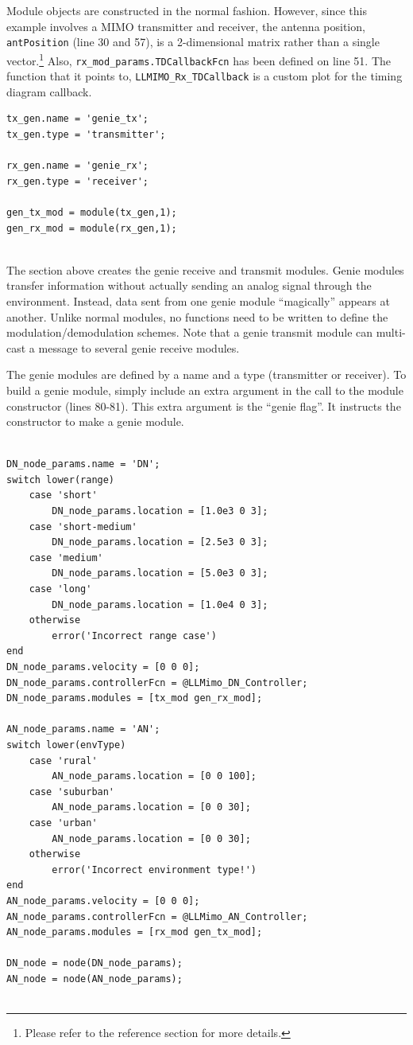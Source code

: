 Module objects are constructed in the normal fashion.  However,
since this example involves a MIMO transmitter and receiver, the
antenna position, \verb+antPosition+ (line 30 and 57), is a
2-dimensional matrix rather than a single vector.\footnote{Please
refer to the reference section for more details.}  Also,
\verb+rx_mod_params.TDCallbackFcn+ has been defined on line 51.  The
function that it points to, \verb+LLMIMO_Rx_TDCallback+ is a custom
plot for the timing diagram callback.

\begin{lstlisting}[name=llmimoBuild]
% Create genie modules
tx_gen.name = 'genie_tx';
tx_gen.type = 'transmitter';

rx_gen.name = 'genie_rx';
rx_gen.type = 'receiver';

gen_tx_mod = module(tx_gen,1);
gen_rx_mod = module(rx_gen,1);


\end{lstlisting}

The section above creates the genie receive and transmit modules.
Genie modules transfer information without actually sending an
analog signal through the environment.  Instead, data sent from one
genie module ``magically'' appears at another.  Unlike normal
modules, no functions need to be written to define the
modulation/demodulation schemes.  Note that a genie transmit module can multi-cast a message to several genie receive modules.

The genie modules are defined by a name and a type (transmitter or
receiver). To build a genie module, simply include an extra argument
in the call to the module constructor (lines 80-81).  This extra
argument is the ``genie flag''.  It instructs the constructor to
make a genie module.

\begin{lstlisting}[name=llmimoBuild]
% Define nodes

DN_node_params.name = 'DN';
switch lower(range)
    case 'short'
        DN_node_params.location = [1.0e3 0 3];
    case 'short-medium'
        DN_node_params.location = [2.5e3 0 3];
    case 'medium'
        DN_node_params.location = [5.0e3 0 3];
    case 'long'
        DN_node_params.location = [1.0e4 0 3];
    otherwise
        error('Incorrect range case')
end
DN_node_params.velocity = [0 0 0];
DN_node_params.controllerFcn = @LLMimo_DN_Controller;
DN_node_params.modules = [tx_mod gen_rx_mod];

AN_node_params.name = 'AN';
switch lower(envType)
    case 'rural'
        AN_node_params.location = [0 0 100];
    case 'suburban'
        AN_node_params.location = [0 0 30];
    case 'urban'
        AN_node_params.location = [0 0 30];
    otherwise
        error('Incorrect environment type!')
end
AN_node_params.velocity = [0 0 0];
AN_node_params.controllerFcn = @LLMimo_AN_Controller;
AN_node_params.modules = [rx_mod gen_tx_mod];

DN_node = node(DN_node_params);
AN_node = node(AN_node_params);


\end{lstlisting}

